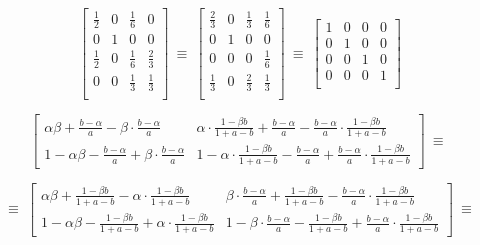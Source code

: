\documentclass[twoside, a3paper]{report}
\begin{document}
$$
\left[
\begin{matrix}
	\frac12 & 0 & \frac16 & 0 \\
	0 		& 1 & 0       & 0 \\
	\frac12 & 0 & \frac16 & \frac23 \\
	0		& 0 & \frac13 & \frac13 \\
\end{matrix}
\right] \ \equiv \ \left[
\begin{matrix}
	\frac23 & 0 & \frac13 & \frac16 \\
	0 		& 1 & 0       & 0 \\
	0       & 0 & 0       & \frac16 \\
	\frac13	& 0 & \frac23 & \frac13 \\
\end{matrix}
\right] \ \equiv \ \left[
\begin{matrix}
	1 & 0 & 0 & 0 \\
	0 & 1 & 0 & 0 \\
	0 & 0 & 1 & 0 \\
	0 & 0 & 0 & 1 \\
\end{matrix}
\right]
$$





\vspace{0.5in}

$$
\left[
\begin{matrix}
	\alpha\beta + \frac{b-\alpha}{a} - \beta \cdot \frac{b-\alpha}{a} & 
	\alpha \cdot \frac{1-\beta b}{1+a-b} + \frac{b-\alpha}{a} - \frac{b-\alpha}{a} \cdot \frac{1-\beta b}{1 + a - b} \\
	1 - \alpha\beta - \frac{b-\alpha}{a} + \beta \cdot \frac{b-\alpha}{a} & 
	1 - \alpha \cdot \frac{1-\beta b}{1+a-b} - \frac{b-\alpha}{a} + \frac{b-\alpha}{a} \cdot \frac{1-\beta b}{1 + a - b}
\end{matrix}
\right]
\ \equiv \
$$

$$
\ \equiv \
\left[
\begin{matrix}
	\alpha\beta + \frac{1-\beta b}{1 + a - b} - \alpha \cdot \frac{1-\beta b}{1 + a - b} & 
	\beta \cdot \frac{b-\alpha}{a} + \frac{1-\beta b}{1+a-b} - \frac{b-\alpha}{a} \cdot \frac{1 - \beta b}{1 + a - b} \\
	1 - \alpha\beta - \frac{1-\beta b}{1 + a - b} + \alpha \cdot \frac{1-\beta b}{1 + a - b} & 
	1 - \beta \cdot \frac{b-\alpha}{a} - \frac{1-\beta b}{1+a-b} + \frac{b-\alpha}{a} \cdot \frac{1 - \beta b}{1 + a - b}
\end{matrix}
\right]
\ \equiv \
$$
\end{document}

